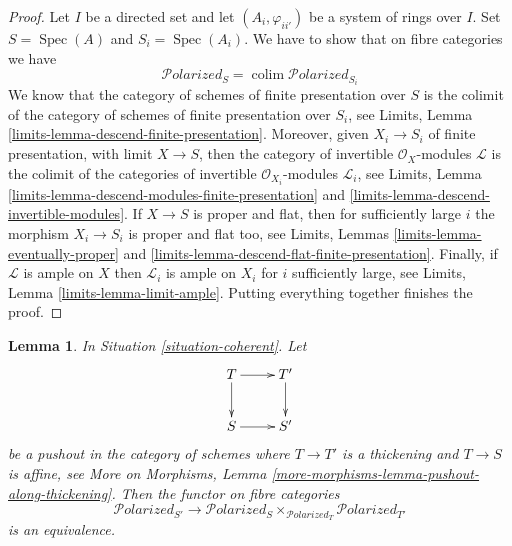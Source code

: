 \documentclass{stacks-project}
\theoremstyle{plain}
\newtheorem{lemma}[subsection]{Lemma}
\theoremstyle{definition}
\theoremstyle{remark}
\numberwithin{equation}{subsection}
\def\colim{\mathop{\mathrm{colim}}\nolimits}
\def\Spec{\mathop{\mathrm{Spec}}}
\def\Polarizedstack{\mathcal{P}\!\mathit{olarized}}
\begin{document}
\begin{proof}
Let $I$ be a directed set and let $(A_i, \varphi_{ii'})$
be a system of rings over $I$. Set $S = \Spec(A)$ and
$S_i = \Spec(A_i)$. We have to show that on fibre categories we have
$$
\Polarizedstack_S = \colim \Polarizedstack_{S_i}
$$
We know that the category of schemes of finite presentation over
$S$ is the colimit of the category of schemes of finite presentation
over $S_i$, see
Limits, Lemma \ref{limits-lemma-descend-finite-presentation}.
Moreover, given $X_i \to S_i$ of finite presentation, with
limit $X \to S$, then the category of invertible
$\mathcal{O}_X$-modules $\mathcal{L}$ is the colimit of the categories
of invertible $\mathcal{O}_{X_i}$-modules $\mathcal{L}_i$, see
Limits, Lemma \ref{limits-lemma-descend-modules-finite-presentation} and
\ref{limits-lemma-descend-invertible-modules}.
If $X \to S$ is proper and flat, then for sufficiently large
$i$ the morphism $X_i \to S_i$ is proper and flat too, see
Limits, Lemmas \ref{limits-lemma-eventually-proper} and
\ref{limits-lemma-descend-flat-finite-presentation}.
Finally, if $\mathcal{L}$ is ample on $X$
then $\mathcal{L}_i$ is ample on $X_i$ for
$i$ sufficiently large, see
Limits, Lemma \ref{limits-lemma-limit-ample}.
Putting everything together finishes the proof.
\end{proof}

\begin{lemma}
\label{lemma-polarized-RS-star}
In Situation \ref{situation-coherent}. Let
$$
\xymatrix{
T \ar[r] \ar[d] & T' \ar[d] \\
S \ar[r] & S'
}
$$
be a pushout in the category of schemes where
$T \to T'$ is a thickening and $T \to S$ is affine, see
More on Morphisms, Lemma \ref{more-morphisms-lemma-pushout-along-thickening}.
Then the functor on fibre categories
$$
\Polarizedstack_{S'}
\longrightarrow
\Polarizedstack_S \times_{\Polarizedstack_T} \Polarizedstack_{T'}
$$
is an equivalence.
\end{lemma}
\end{document}
